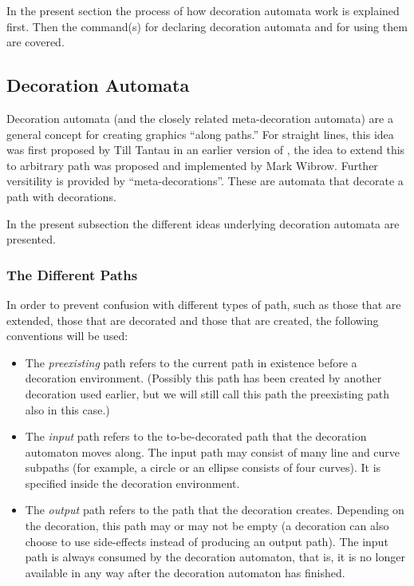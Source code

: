 In the present section the process of how decoration automata work is
explained first. Then the command(s) for declaring decoration automata
and for using them are covered.



\subsection{Decoration Automata}

Decoration automata (and the closely related meta-decoration automata)
are a general concept for creating graphics ``along paths.'' For
straight lines, this idea was first proposed by Till Tantau in an
earlier version of \pgfname, the idea to extend this to arbitrary path
was proposed and implemented by Mark Wibrow. Further versitility is
provided by ``meta-decorations''. These are automata that decorate a
path with decorations. 

In the present subsection the different ideas underlying decoration
automata are presented.



\subsubsection{The Different Paths}

In order to prevent confusion with different types of path, such
as those that are extended, those that are decorated and those that 
are created, the following conventions will be used:

\begin{itemize}
\item 
  The \emph{preexisting} path refers to the current path in existence 
  before a decoration environment. (Possibly this path has been
  created by another decoration used earlier, but we will still call
  this path the preexisting path also in this case.)
\item
  The \emph{input} path refers to the to-be-decorated path that the
  decoration automaton moves along. The input path may consist of many
  line and curve subpaths (for example, a circle or an ellipse
  consists of four curves). It is specified inside the decoration
  environment. 
\item
  The \emph{output} path refers to the path that the decoration 
  creates. Depending on the decoration, this path may or may not be
  empty (a decoration can also choose to use side-effects instead of
  producing an output path). The input path is always consumed by the
  decoration automaton, that is, it is no longer available in any way
  after the decoration automaton has finished. 
\end{itemize}

